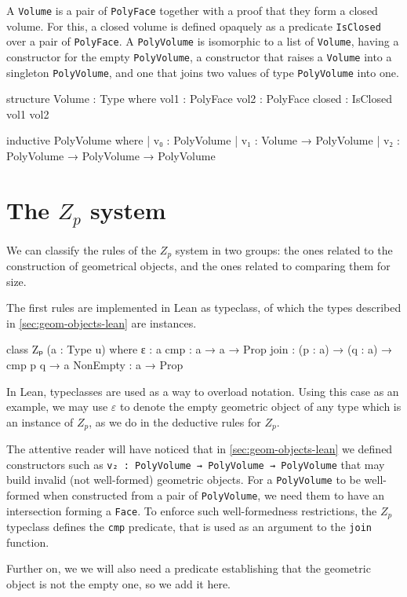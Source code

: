 \documentclass[12pt]{article} %
\newcommand{\leanline}[1]{\texttt{#1}} %
\newcommand{\face}{\texttt{Face}} %
\newcommand{\pface}{\texttt{PolyFace}} %
\newcommand{\volume}{\texttt{Volume}} %
\newcommand{\pvolume}{\texttt{PolyVolume}} %
\newcommand{\zp}{\ensuremath{Z_{p}}}
\begin{document}
A \volume{} is a pair of \pface{} together with a proof that they form a
closed volume. %
For this, a closed volume is defined opaquely as a predicate \leanline{IsClosed} over a pair of \pface. %
A \pvolume{} is isomorphic to a list of \volume, having a constructor for the empty \pvolume, a constructor that raises a \volume{} into a singleton \pvolume, and one that joins two values of type \pvolume{} into one. %
\begin{leancode}
structure Volume : Type where
  vol1 : PolyFace
  vol2 : PolyFace
  closed : IsClosed vol1 vol2

inductive PolyVolume where
| v₀ : PolyVolume
| v₁ : Volume → PolyVolume
| v₂ : PolyVolume → PolyVolume → PolyVolume
\end{leancode}

\section{The \zp{} system}\label{sec:zp-system} %

We can classify the rules of the \zp{} system in two groups: the ones related to the construction of geometrical objects, and the ones related to comparing them for size. %

The first rules are implemented in Lean as typeclass, of which the types described in \cref{sec:geom-objects-lean} are instances. %
\begin{leancode}
class Zₚ (a : Type u) where
  ε : a
  cmp : a → a → Prop
  join : (p : a) → (q : a) → cmp p q → a
  NonEmpty : a → Prop
\end{leancode}

In Lean, typeclasses are used as a way to overload notation. %
Using this case as an example, we may use \(\varepsilon\) to denote the empty geometric object of any type which is an instance of \zp{}, as we do in the deductive rules for \zp{}. %

The attentive reader will have noticed that in \cref{sec:geom-objects-lean} we defined constructors such as \leanline{v₂ : PolyVolume → PolyVolume → PolyVolume} that may build invalid (not well-formed) geometric objects. %
For a \pvolume{} to be well-formed when constructed from a pair of \pvolume, we need them to have an intersection forming a \face. %
To enforce such well-formedness restrictions, the \zp{} typeclass defines the \leanline{cmp} predicate, that is used as an argument to the \leanline{join} function. %

Further on, we we will also need a predicate establishing that the geometric object is not the empty one, so we add it here. %
\end{document}
